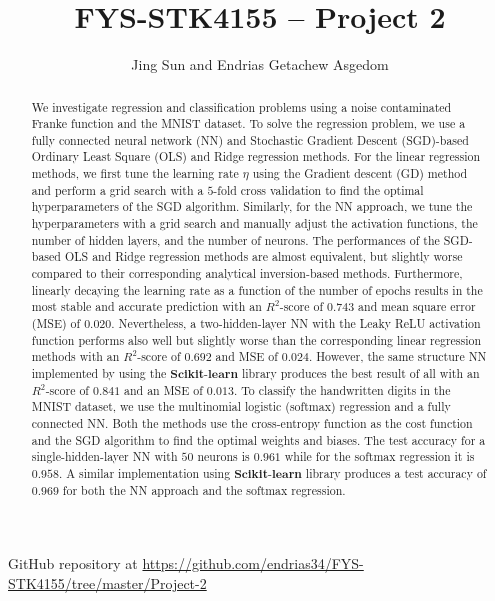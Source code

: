 \documentclass[a4paper]{article}
\begin{document}
\title{FYS-STK4155 -- Project 2}
\author{Jing Sun and Endrias Getachew Asgedom}

\maketitle
\begin{abstract}
We investigate regression and classification problems using a noise contaminated Franke function and the MNIST dataset. To solve the regression problem, we use a fully connected neural network (NN) and Stochastic Gradient Descent (SGD)-based Ordinary Least Square (OLS) and Ridge regression methods. For the linear regression methods, we first tune the learning rate $\eta$ using the Gradient descent (GD) method and perform a grid search with a $5$-fold cross validation to find the optimal hyperparameters of the SGD algorithm. Similarly, for the NN approach, we tune the hyperparameters with a grid search and manually adjust the activation functions, the number of hidden layers, and the number of neurons. The performances of the SGD-based OLS and Ridge regression methods are almost equivalent, but slightly worse compared to their corresponding analytical inversion-based methods. Furthermore, linearly decaying the learning rate as a function of the number of epochs results in the most stable and accurate prediction with an $R^2$-score of $0.743$ and mean square error (MSE) of $0.020$. Nevertheless, a two-hidden-layer NN with the Leaky ReLU activation function performs also well but slightly worse than the corresponding linear regression methods with an $R^2$-score of $0.692$ and MSE of $0.024$. However, the same structure NN implemented by using the $\mathbf{Scikit}$-$\mathbf{learn}$ library produces the best result of all with an $R^2$-score of $0.841$ and an MSE of $0.013$. To classify the handwritten digits in the MNIST dataset, we use the multinomial logistic (softmax) regression and a fully connected NN. Both the methods use the cross-entropy function as the cost function and the SGD algorithm to find the optimal weights and biases. The test accuracy for a single-hidden-layer NN with $50$ neurons is $0.961$ while for the softmax regression it is $0.958$. A similar implementation using $\mathbf{Scikit}$-$\mathbf{learn}$ library produces a test accuracy of $0.969$ for both the NN approach and the softmax regression.
\noindent
\end{abstract}
\newpage

\tableofcontents

\begin{center}
    GitHub repository at \url{https://github.com/endrias34/FYS-STK4155/tree/master/Project-2}
\end{center}
\end{document}
